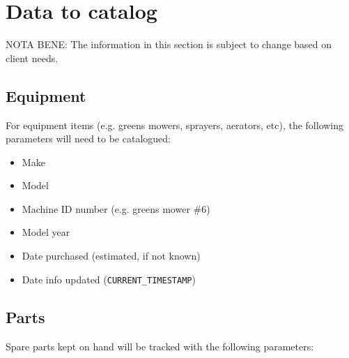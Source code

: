 \documentclass[titlepage]{article}
\begin{document}
    \section{Data to catalog}
        NOTA BENE: The information in this section is subject to change based on client needs.
        
        \subsection{Equipment}
            For equipment items (e.g. greens mowers, sprayers, aerators, etc), the following
            parameters will need to be catalogued:
            
            \begin{itemize}
                \item
                Make
                
                \item
                Model
                
                \item
                Machine ID number (e.g. greens mower \#6)
                
                \item
                Model year
                
                \item
                Date purchased (estimated, if not known)
                
                \item
                Date info updated (\verb|CURRENT_TIMESTAMP|)
                
            \end{itemize}
        
        \subsection{Parts}
            Spare parts kept on hand will be tracked with the following parameters:
            
\end{document}
